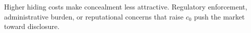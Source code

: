 \documentclass[10pt,letterpaper]{bp-template-concise}
\begin{document}
Higher hiding costs make concealment less attractive. Regulatory enforcement, administrative burden, or reputational concerns that raise $c_0$ push the market toward disclosure.



\clearpage


\end{document}
